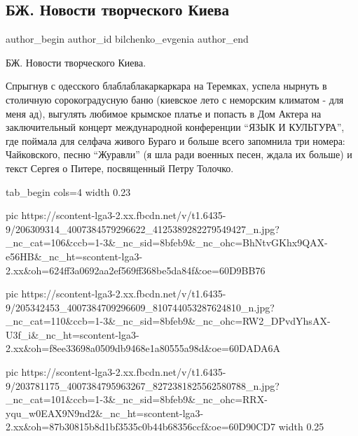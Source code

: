  
 
 
 
 
 
\subsection{БЖ. Новости творческого Киева}
\label{sec:24_06_2021.fb.bilchenko_evgenia.9.novosti_tvorchestkogo_kieva}
\ifcmt
 author_begin
   author_id bilchenko_evgenia
 author_end
\fi

БЖ. Новости творческого Киева.

Спрыгнув с одесского блаблаблакаркаркара на Теремках, успела нырнуть в
столичную сорокоградусную баню (киевское лето с неморским климатом - для меня
ад), выгулять любимое крымское платье и попасть в Дом Актера на заключительный
концерт международной конференции \enquote{ЯЗЫК И КУЛЬТУРА}, где поймала для селфача
живого Бураго и больше всего запомнила три номера: Чайковского, песню \enquote{Журавли}
(я шла ради военных песен, ждала их больше) и текст Сергея о Питере,
посвященный Петру Толочко. 

\ifcmt
  tab_begin cols=4
    width 0.23

     pic https://scontent-lga3-2.xx.fbcdn.net/v/t1.6435-9/206309314_4007384579296622_4125389282279549427_n.jpg?_nc_cat=106&ccb=1-3&_nc_sid=8bfeb9&_nc_ohc=BhNtvGKhx9QAX-e56HB&_nc_ht=scontent-lga3-2.xx&oh=624ff3a0692aa2ef569ff368be5da84f&oe=60D9BB76

     pic https://scontent-lga3-2.xx.fbcdn.net/v/t1.6435-9/205342453_4007384709296609_810744053287624810_n.jpg?_nc_cat=110&ccb=1-3&_nc_sid=8bfeb9&_nc_ohc=RW2_DPvdYhsAX-U3f_i&_nc_ht=scontent-lga3-2.xx&oh=f8ee33698a0509db9468e1a80555a98d&oe=60DADA6A

     pic https://scontent-lga3-2.xx.fbcdn.net/v/t1.6435-9/203781175_4007384795963267_8272381825562580788_n.jpg?_nc_cat=101&ccb=1-3&_nc_sid=8bfeb9&_nc_ohc=RRX-yqu_w0EAX9N9nd2&_nc_ht=scontent-lga3-2.xx&oh=87b30815b8d1bf3535c0b44b68356ccf&oe=60D90CD7
     width 0.25

